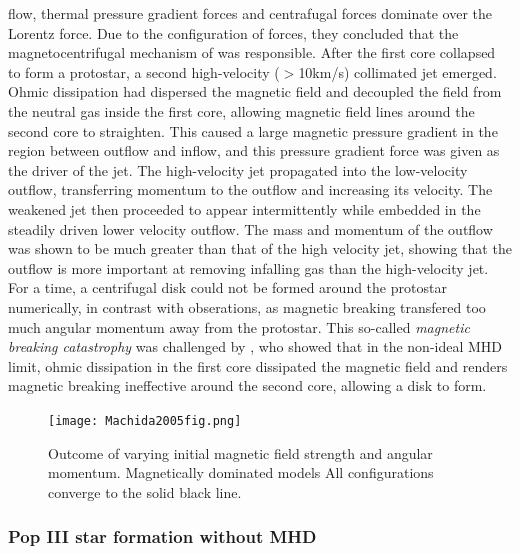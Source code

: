 \documentclass[11pt]{article}
\begin{document}
flow, thermal pressure gradient forces and centrafugal forces dominate over the Lorentz force. Due to the configuration of forces, they concluded that the magnetocentrifugal mechanism of \cite{Blandford1982} was responsible. After the first core collapsed to form a protostar, a second high-velocity ($>$10km/s) collimated jet emerged. Ohmic dissipation had dispersed the magnetic field and decoupled the field from the neutral gas inside the first core, allowing magnetic field lines around the second core to straighten. This caused a large magnetic pressure gradient in the region between outflow and inflow, and this pressure gradient force was given as the driver of the jet. The high-velocity jet propagated into the low-velocity outflow, transferring momentum to the outflow and increasing its velocity. The weakened jet then proceeded to appear intermittently while embedded in the steadily driven lower velocity outflow. The mass and momentum of the outflow was shown to be much greater than that of the high velocity jet, showing that the outflow is more important at removing infalling gas than the high-velocity jet. For a time, a centrifugal disk could not be formed around the protostar numerically, in contrast with obserations, as magnetic breaking transfered too much angular momentum away from the protostar. This so-called \emph{magnetic breaking catastrophy} was challenged by \cite{Basu2010}, who showed that in the non-ideal MHD limit, ohmic dissipation in the first core dissipated the magnetic field and renders magnetic breaking ineffective around the second core, allowing a disk to form. 



\begin{figure}[h!]
         \centering
		\texttt{[image: Machida2005fig.png]}
		\caption{Outcome of varying initial magnetic field strength and angular momentum. Magnetically dominated models All configurations converge to the solid black line. \citep{Machida2005}}
		\label{fig:Machida2005}
\end{figure}

\subsubsection{Pop III star formation without MHD}
\label{sub:popIII}
\end{document}
